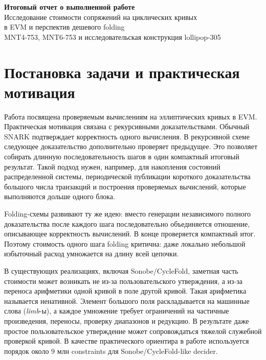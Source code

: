 \documentclass[12pt,a4paper]{article}
\begin{document}
\begin{center}
    {\Large\bfseries Итоговый отчет о выполненной работе}\\[0.4em]
    {\large Исследование стоимости сопряжений на циклических кривых\\
    в EVM и перспектив дешевого folding}\\[0.4em]
    {\normalsize MNT4-753, MNT6-753 и исследовательская конструкция lollipop-305}
\end{center}

\tableofcontents
\vspace{0.4em}

\section{Постановка задачи и практическая мотивация}

Работа посвящена проверяемым вычислениям на эллиптических кривых в EVM.
Практическая мотивация связана с рекурсивными доказательствами. Обычный
SNARK подтверждает корректность одного вычисления. В рекурсивной схеме
следующее доказательство дополнительно проверяет предыдущее. Это позволяет
собирать длинную последовательность шагов в один компактный итоговый
результат. Такой подход нужен, например, для накопления состояний
распределенной системы, периодической публикации короткого доказательства
большого числа транзакций и построения проверяемых вычислений, которые
выполняются дольше одного блока.

Folding-схемы развивают ту же идею: вместо генерации независимого полного
доказательства после каждого шага последовательно объединяется отношение,
описывающее корректность вычислений. В конце проверяется компактный итог.
Поэтому стоимость одного шага folding критична: даже локально небольшой
избыточный расход умножается на длину всей цепочки.

В существующих реализациях, включая Sonobe/CycleFold, заметная часть стоимости
может возникать не из-за пользовательского утверждения, а из-за переноса
арифметики одной кривой в поле другой кривой. Такая арифметика называется
ненативной. Элемент большого поля раскладывается на машинные слова
(\emph{limb}-ы), а каждое умножение требует ограничений на частичные
произведения, переносы, проверку диапазонов и редукцию. В результате даже
простое пользовательское утверждение может сопровождаться тяжелой служебной
проверкой кривой. В качестве практического ориентира в работе используется
порядок около $9$ млн constraints для Sonobe/CycleFold-like decider.
\end{document}
